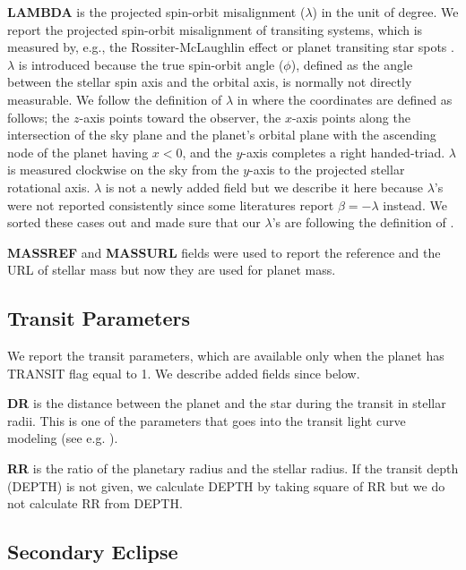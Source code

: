 \documentclass[11pt,preprint]{aastex}
\begin{document}
\begin{CJK*}{UTF8}{gbsn}
{\bf LAMBDA} is the projected spin-orbit misalignment ($\lambda$) in
the unit of degree. We report the projected spin-orbit misalignment of
transiting systems, which is measured by, e.g., the
Rossiter-McLaughlin effect \citep[e.g.,][]{Winn2005} or planet
transiting star spots \citep[e.g.,][]{Sanchis-Ojeda2012}. $\lambda$ is
introduced because the true spin-orbit angle ($\phi$), defined as the
angle between the stellar spin axis and the orbital axis, is normally
not directly measurable. We follow the definition of $\lambda$ in
\cite{Fabrycky2009} where the coordinates are defined as follows; the
$z$-axis points toward the observer, the $x$-axis points along the
intersection of the sky plane and the planet's orbital plane with the
ascending node of the planet having $x<0$, and the $y$-axis completes
a right handed-triad. $\lambda$ is measured clockwise on the sky from
the $y$-axis to the projected stellar rotational axis. $\lambda$ is
not a newly added field but we describe it here because $\lambda$'s
were not reported consistently since some literatures report $\beta =
-\lambda$ instead. We sorted these cases out and made sure that our
$\lambda$'s are following the definition of \cite{Fabrycky2009}.

{\bf MASSREF} and {\bf MASSURL} fields were used to report the
reference and the URL of stellar mass but now they are used for planet
mass.

\subsection{Transit Parameters}\label{sec:transit}

We report the transit parameters, which are available only when the
planet has TRANSIT flag equal to 1. We describe added fields since
\cite{Wright2011} below.

{\bf DR} is the distance between the planet and the star during the
transit in stellar radii. This is one of the parameters that goes into
the transit light curve modeling (see e.g. \citealt{Batalha2013}).

{\bf RR} is the ratio of the planetary radius and the stellar
radius. If the transit depth (DEPTH) is not given, we calculate DEPTH
by taking square of RR but we do not calculate RR from DEPTH.


\subsection{Secondary Eclipse}\label{sec:se}


\end{CJK*}
\end{document}

